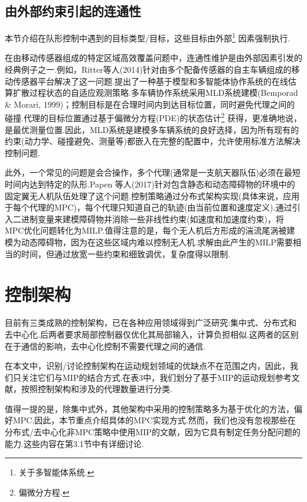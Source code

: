 \documentclass[10pt]{article}
\begin{document}
\subsection{由外部约束引起的连通性}

本节介绍在队形控制中遇到的目标类型/目标，这些目标由外部\footnote{关于多智能体系统.} 因素强制执行.

在由移动传感器组成的特定区域高效覆盖问题中，连通性维护是由外部因素引发的经典例子之一.例如，Ritter等人(2014)针对由多个配备传感器的自主车辆组成的移动传感器平台解决了这一问题.提出了一种基于模型和多智能体协作系统的在线估算扩散过程状态的自适应观测策略.多车辆协作系统采用MLD系统建模(Bemporad \& Morari, 1999)；控制目标是在合理时间内到达目标位置，同时避免代理之间的碰撞.代理的目标位置通过基于偏微分方程(PDE)的状态估计\footnote{偏微分方程.} 获得，更准确地说，是最优测量位置.因此，MLD系统是建模多车辆系统的良好选择，因为所有现有的约束(动力学、碰撞避免、测量等)都嵌入在完整的配置中，允许使用标准方法解决控制问题.



此外，一个常见的问题是会合操作，多个代理(通常是一支航天器队伍)必须在最短时间内达到特定的队形.Papen 等人(2017)针对包含静态和动态障碍物的环境中的固定翼无人机队伍处理了这个问题.控制策略通过分布式架构实现(具体来说，应用于每个代理的MPC)，每个代理只知道自己的轨迹(由当前位置和速度定义).通过引入二进制变量来建模障碍物并消除一些非线性约束(如速度和加速度约束)，将MPC优化问题转化为MILP.值得注意的是，每个无人机后方形成的湍流尾涡被建模为动态障碍物，因为在这些区域内难以控制无人机.求解由此产生的MILP需要相当的时间，但通过放宽一些约束和细致调优，复杂度得以限制.

\section{控制架构}

目前有三类成熟的控制架构，已在各种应用领域得到广泛研究:集中式、分布式和去中心化.后两者要求局部控制器仅优化其局部输入，计算负担相似.这两者的区别在于通信的影响，去中心化控制不需要代理之间的通信.

在本文中，识别/讨论控制架构在运动规划领域的优缺点不在范围之内，因此，我们只关注它们与MIP的结合方式.在表3中，我们划分了基于MIP的运动规划参考文献，按照控制架构和涉及的代理数量进行分类.

值得一提的是，除集中式外，其他架构中采用的控制策略多为基于优化的方法，偏好MPC.因此，本节重点介绍具体的MPC实现方式.然而，我们也没有忽视那些在分布式/去中心化非MPC策略中使用MIP的文献，因为它具有制定任务分配问题的能力.这些内容在第3.1节中有详细讨论.
\end{document}
